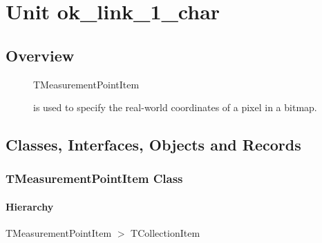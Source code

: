 \documentclass{report}
\newif\ifpdf
\begin{document}
\label{toc}\tableofcontents
\newpage
\newlength{\tmplength}
\chapter{Unit ok{\_}link{\_}1{\_}char}
\label{ok_link_1_char}
\section{Overview}
\begin{description}
\item[\texttt{\begin{ttfamily}TMeasurementPointItem\end{ttfamily} Class}]\begin{ttfamily}TMeasurementPointItem\end{ttfamily} is used to specify the real{-}world coordinates of a pixel in a bitmap.
\end{description}
\section{Classes, Interfaces, Objects and Records}
\ifpdf
\subsection*{\large{\textbf{TMeasurementPointItem Class}}\normalsize\hspace{1ex}\hrulefill}
\else
\subsection*{TMeasurementPointItem Class}
\fi
\label{ok_link_1_char.TMeasurementPointItem}
\subsubsection*{\large{\textbf{Hierarchy}}\normalsize\hspace{1ex}\hfill}
TMeasurementPointItem {$>$} TCollectionItem
\end{document}
